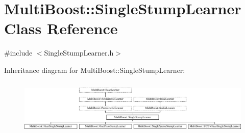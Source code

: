 \hypertarget{classMultiBoost_1_1SingleStumpLearner}{
\section{MultiBoost::SingleStumpLearner Class Reference}
\label{classMultiBoost_1_1SingleStumpLearner}
}


{\ttfamily \#include $<$SingleStumpLearner.h$>$}

Inheritance diagram for MultiBoost::SingleStumpLearner:\begin{figure}[H]
\begin{center}
\leavevmode
\includegraphics[height=2.692308cm]{classMultiBoost_1_1SingleStumpLearner}
\end{center}
\end{figure}

